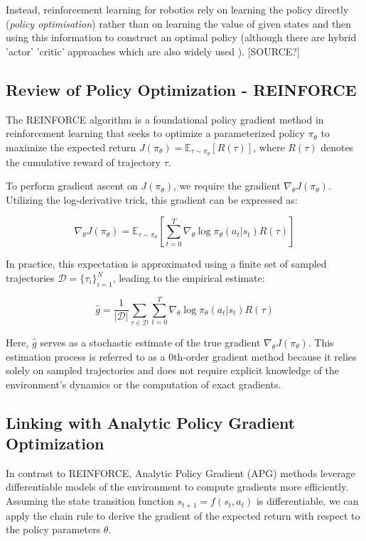\documentclass[logo,bsc,singlespacing,parskip]{infthesis}
\begin{document}
Instead, reinforcement learning for robotics rely on learning the policy directly (\textit{policy optimisation}) rather than on learning the value of given states and then using this information to construct an optimal policy (although there are hybrid 'actor' 'critic' approaches which are also widely used ). [SOURCE?] 

\subsection*{Review of Policy Optimization - REINFORCE}

The REINFORCE algorithm is a foundational policy gradient method in reinforcement learning that seeks to optimize a parameterized policy $\pi_\theta$ to maximize the expected return $J(\pi_\theta) = \mathbb{E}_{\tau \sim \pi_\theta}[R(\tau)]$, where $R(\tau)$ denotes the cumulative reward of trajectory $\tau$.

To perform gradient ascent on $J(\pi_\theta)$, we require the gradient $\nabla_\theta J(\pi_\theta)$. Utilizing the log-derivative trick, this gradient can be expressed as:

\[
\nabla_\theta J(\pi_\theta) = \mathbb{E}_{\tau \sim \pi_\theta} \left[ \sum_{t=0}^{T} \nabla_\theta \log \pi_\theta(a_t | s_t) R(\tau) \right]
\]

In practice, this expectation is approximated using a finite set of sampled trajectories $\mathcal{D} = \{\tau_i\}_{i=1}^N$, leading to the empirical estimate:

\[
\hat{g} = \frac{1}{|\mathcal{D}|} \sum_{\tau \in \mathcal{D}} \sum_{t=0}^{T} \nabla_\theta \log \pi_\theta(a_t | s_t) R(\tau)
\]

Here, $\hat{g}$ serves as a stochastic estimate of the true gradient $\nabla_\theta J(\pi_\theta)$. This estimation process is referred to as a 0th-order gradient method because it relies solely on sampled trajectories and does not require explicit knowledge of the environment's dynamics or the computation of exact gradients.

\subsection*{Linking with Analytic Policy Gradient Optimization}

In contrast to REINFORCE, Analytic Policy Gradient (APG) methods leverage differentiable models of the environment to compute gradients more efficiently. Assuming the state transition function $s_{t+1} = f(s_t, a_t)$ is differentiable, we can apply the chain rule to derive the gradient of the expected return with respect to the policy parameters $\theta$.
\end{document}

